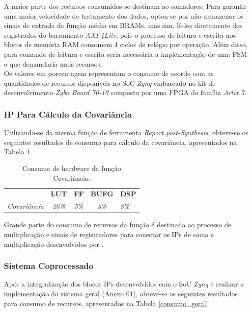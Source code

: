 A maior parte dos recursos consumidos se destinam ao somadores. Para garantir uma maior velocidade de tratamento dos dados, optou-se por não armazenar os sinais de entrada da função média em BRAMs, mas sim, lê-los diretamente dos registrados do barramento \textit{AXI-4Lite}, pois o processo de leitura e escrita nos blocos de memória RAM consomem 4 ciclos de relógio por operação. Além disso, para comando de leitura e escrita seria necessária a implementação de uma FSM o que demandaria mais recursos.\\
Os valores em porcentagem representam o consumo de acordo com as quantidades de recursos disponíveis no SoC \textit{Zynq} embarcado no kit de desenvolvimento \textit{Zybo Board 70-10} composto por uma FPGA do família \textit{Artix 7}.

\subsubsection{IP Para Cálculo da Covariância}
Utilizando-se da mesma função de ferramenta \textit{Report post-Synthesis}, obteve-se os seguintes resultados de consumo para cálculo da covariância, apresentados na Tabela \ref{consumo_cov}.

\begin{table}[!h]
	\centering
	\caption{Consumo de hardware da função Covariância.}
	\label{consumo_cov}
	\begin{tabular}{ccccl}
		\textbf{}         & \textbf{LUT}  & \textbf{FF}  & \textbf{BUFG} & \textbf{DSP} \\
		\textit{Covariância} & \textit{26\%} & \textit{5\%} & \textit{3\%}  & \textit{8\%}
	\end{tabular}
\end{table}

Grande parte do consumo de recursos da função é destinada ao processo de multiplicação e sinais de registradores para conectar os IPs de soma e multiplicação desenvolvidos por \cite{munoz2010tradeoff}.

\subsubsection{Sistema Coprocessado}

Após a integralização dos blocos IPs desenvolvidos com o SoC \textit{Zynq} e realizar a implementação do sistema geral (Anexo 01), obteve-se os seguintes resultados para consumo de recursos, apresentados na Tabela \ref{consumo_geral}

